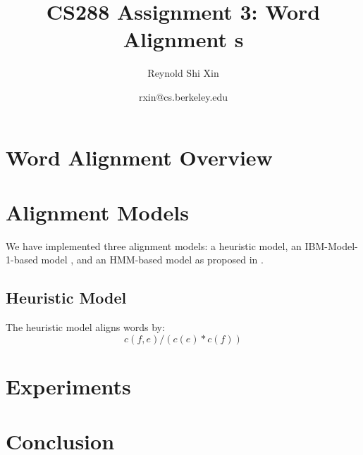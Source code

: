 \documentclass[12pt]{article}   %
\begin{document}
\title{CS288 Assignment 3: Word Alignment s}   %
\author{Reynold Shi Xin}         %
\date{rxin@cs.berkeley.edu}    %
\maketitle

\begin{abstract}

\end{abstract}

\section{Word Alignment Overview}


\section{Alignment Models}

We have implemented three alignment models: a heuristic model, an IBM-Model-1-based model \cite{ibm-models}, and an HMM-based model as proposed in \cite{hmm-model}.

\subsection{Heuristic Model}
The heuristic model aligns words by:
$$ c(f,e)/(c(e)*c(f)) $$


\section{Experiments}


\section{Conclusion}




\end{document}
